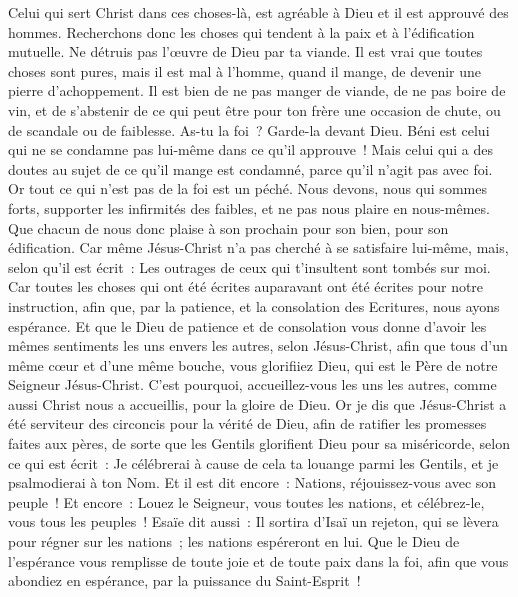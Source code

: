 \begin{multicols}{2}
Celui qui sert Christ dans ces choses-là, est agréable à Dieu et il est approuvé des hommes.
Recherchons donc les choses qui tendent à la paix et à l'édification mutuelle.
Ne détruis pas l'œuvre de Dieu par ta viande. Il est vrai que toutes choses sont pures, mais il est mal à l'homme, quand il mange, de devenir une pierre d'achoppement.
Il est bien de ne pas manger de viande, de ne pas boire de vin, et de s'abstenir de ce qui peut être pour ton frère une occasion de chute, ou de scandale ou de faiblesse.
As-tu la foi~? Garde-la devant Dieu. Béni est celui qui ne se condamne pas lui-même dans ce qu'il approuve~!
Mais celui qui a des doutes au sujet de ce qu'il mange est condamné, parce qu'il n'agit pas avec foi. Or tout ce qui n'est pas de la foi est un péché.
\VerseOne{}Nous devons, nous qui sommes forts, supporter les infirmités des faibles, et ne pas nous plaire en nous-mêmes.
Que chacun de nous donc plaise à son prochain pour son bien, pour son édification.
Car même Jésus-Christ n'a pas cherché à se satisfaire lui-même, mais, selon qu'il est écrit~: Les outrages de ceux qui t'insultent sont tombés sur moi.
Car toutes les choses qui ont été écrites auparavant ont été écrites pour notre instruction, afin que, par la patience, et la consolation des Ecritures, nous ayons espérance.
Et que le Dieu de patience et de consolation vous donne d'avoir les mêmes sentiments les uns envers les autres, selon Jésus-Christ,
afin que tous d'un même cœur et d'une même bouche, vous glorifiiez Dieu, qui est le Père de notre Seigneur Jésus-Christ.
C'est pourquoi, accueillez-vous les uns les autres, comme aussi Christ nous a accueillis, pour la gloire de Dieu.
Or je dis que Jésus-Christ a été serviteur des circoncis pour la vérité de Dieu, afin de ratifier les promesses faites aux pères,
de sorte que les Gentils glorifient Dieu pour sa miséricorde, selon ce qui est écrit~: Je célébrerai à cause de cela ta louange parmi les Gentils, et je psalmodierai à ton Nom. Et il est dit encore~:
Nations, réjouissez-vous avec son peuple~!
Et encore~: Louez le Seigneur, vous toutes les nations, et célébrez-le, vous tous les peuples~! Esaïe dit aussi~:
Il sortira d'Isaï un rejeton, qui se lèvera pour régner sur les nations~; les nations espéreront en lui.
Que le Dieu de l'espérance vous remplisse de toute joie et de toute paix dans la foi, afin que vous abondiez en espérance, par la puissance du Saint-Esprit~!

\end{multicols}

